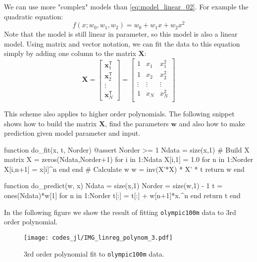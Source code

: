 \documentclass[a4paper,11pt]{article} %
\newcommand{\txtinline}[1]{\texttt{#1}}
\begin{document}
We can use more "complex" models than \eqref{eq:model_linear_02}. For example
the quadratic equation:
\begin{equation}
f(x; w_{0}, w_{1}, w_{2}) = w_{0} + w_{1}x + w_{2}x^{2}
\label{eq:quadratic_eq}
\end{equation}
Note that the model is still linear in parameter, so this model is also a linear model.
Using matrix and vector notation, we can fit the data to this equation simply by
adding one column to the matrix $\mathbf{X}$:
\begin{equation}
\mathbf{X} = \begin{bmatrix}
\mathbf{x}^{\mathsf{T}}_{1} \\
\mathbf{x}^{\mathsf{T}}_{2} \\
\vdots \\
\mathbf{x}^{\mathsf{T}}_{N}
\end{bmatrix} =
\begin{bmatrix}
1 & x_{1} & x_{1}^{2} \\
1 & x_{2} & x_{2}^{2} \\
\vdots & \vdots & \vdots \\
1 & x_{N} & x_{N}^{2} \\
\end{bmatrix}
\end{equation}

This scheme also applies to higher order polynomials. The following snippet shows
how to build the matrix $\mathbf{X}$, find the parameters $\mathbf{w}$ and
also how to make prediction given model parameter and input.
\begin{juliacode}
function do_fit(x, t, Norder)
  @assert Norder >= 1
  Ndata = size(x,1)
  # Build X matrix
  X = zeros(Ndata,Norder+1)
  for i in 1:Ndata
    X[i,1] = 1.0
    for n in 1:Norder
      X[i,n+1] = x[i]^n
    end
  end
  # Calculate w
  w = inv(X'*X) * X' * t
  return w
end

function do_predict(w, x)
  Ndata = size(x,1)
  Norder = size(w,1) - 1
  t = ones(Ndata)*w[1]
  for n in 1:Norder
    t[:] = t[:] + w[n+1]*x.^n
  end
  return t
end
\end{juliacode}

In the following figure we show the result of fitting \txtinline{olympic100m} data
to 3rd order polynomial.
\begin{figure}[H]
\begin{center}
\texttt{[image: codes\_jl/IMG\_linreg\_polynom\_3.pdf]}
\end{center}
\caption{3rd order polynomial fit to \txtinline{olympic100m} data.}
\end{figure}
\end{document}
